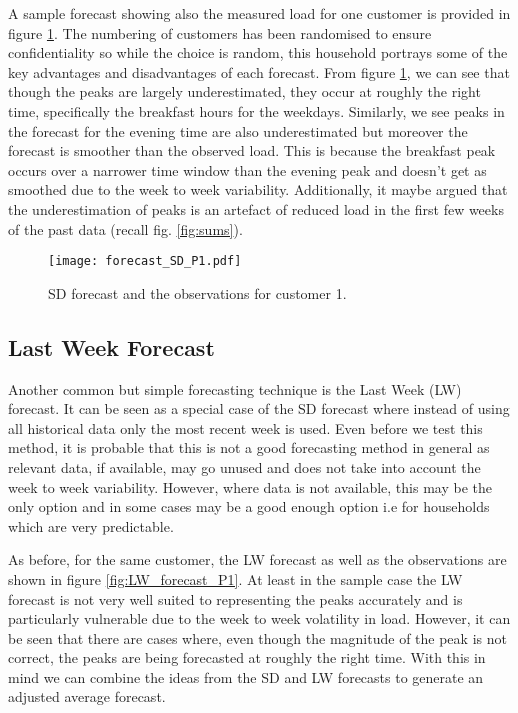 A sample forecast showing also the measured load for one customer is provided in figure \ref{fig:SDforecast}. The numbering of customers has been randomised to ensure confidentiality so while the choice is random, this household portrays some of the key advantages and disadvantages of each forecast. From figure \ref{fig:SDforecast}, we can see that though the peaks are largely underestimated, they occur at roughly the right time, specifically the breakfast hours for the weekdays. Similarly, we see peaks in the forecast for the evening time are also underestimated but moreover the forecast is smoother than the observed load. This is because the breakfast peak occurs over a narrower time window than the evening peak and doesn't get as smoothed due to the week to week variability. Additionally, it maybe argued that the underestimation of peaks is an artefact of reduced load in the first few weeks of the past data (recall fig. \ref{fig:sums}).

\begin{figure}
\centering
\texttt{[image: forecast\_SD\_P1.pdf]}
\caption{SD forecast and the observations for customer 1.}
\label{fig:SDforecast} 
\end{figure}

\subsection{Last Week Forecast}

Another common but simple forecasting technique is the Last Week (LW) forecast. It can be seen as a special case of the SD forecast where instead of using all historical data only the most recent week is used. Even before we test this method, it is probable that this is not a good forecasting method in general as relevant data, if available, may go unused and does not take into account the week to week variability. However, where data is not available, this may be the only option and in some cases may be a good enough option i.e for households which are very predictable.

As before, for the same customer, the LW forecast as well as the observations are shown in figure \ref{fig:LW_forecast_P1}. At least in the sample case the LW forecast is not very well suited to representing the peaks accurately and is particularly vulnerable due to the week to week volatility in load. However, it can be seen that there are cases where, even though the magnitude of the peak is not correct, the peaks are being forecasted at roughly the right time. With this in mind we can combine the ideas from the SD and LW forecasts to generate an adjusted average forecast.

